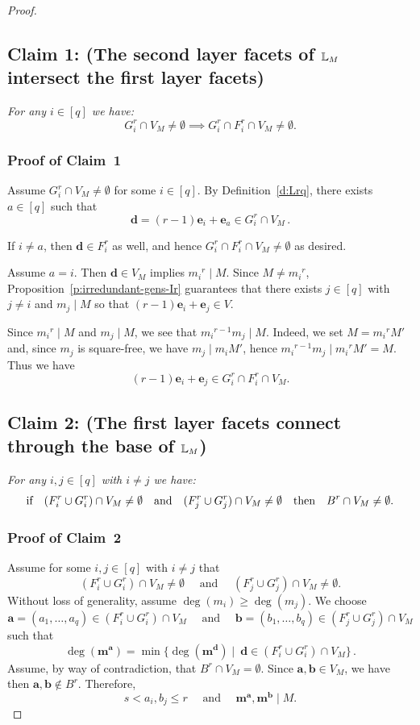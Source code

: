 \documentclass[11pt]{article}
\theoremstyle{definition}
\numberwithin{equation}{section}
\newcommand{\m}{\mathbf{m}}
\newcommand{\bd}{\mathbf{d}}
\newcommand{\ba}{\mathbf{a}}
\newcommand{\bb}{\mathbf{b}}
\newcommand{\be}{\mathbf{e}}
\newcommand{\bma}{\mathbf{m}^\ba}
\newcommand{\bmb}{\mathbf{m}^\bb}
\newcommand{\qand}{\quad \mbox{ and } \quad }
\begin{document}
\begin{proof}
\subsection*{\texorpdfstring{ \bf Claim 1: \textup{(}The second layer facets of ${\mathbb{L}}_M$
  intersect the first layer facets\textup{)}}{}} {\it For any $i\in [q]$ we have:}
$$G^r_{i}\cap V_M\ne \emptyset\implies G^r_{i}\cap F^r_{i}\cap
  V_{M}\ne \emptyset .$$


\subsubsection*{Proof of Claim~1} 
Assume $G^r_{i}\cap V_M\ne \emptyset$ for some $i\in [q]$.
By Definition~\ref{d:Lrq}, there exists $a\in [q]$ such that $$\bd = (r-1)\be_i +
\be_a \in G^r_{i}\cap V_M\,.$$

If $i\ne a$, then $\bd\in F^r_i$ as well, and hence
$G^r_{i}\cap F^r_{i}\cap V_M \ne \emptyset$ as desired.

Assume $a=i$. Then $\bd\in V_M$ implies ${m_i}^r\mid M$. Since $M\neq
{m_i}^r$, Proposition~\ref{p:irredundant-gens-Ir} guarantees that there exists
$j\in [q]$ with $j \neq i$ and $m_j \mid M$ so that $(r-1)\be_i+\be_j
\in V$.

 Since ${m_i}^r\mid M$ and $m_j\mid M$, we see that ${m_i}^{r-1}m_j\mid
 M$.  Indeed, we set $M={m_i}^rM'$ and, since $m_j$ is square-free, we
 have $m_j\mid m_iM'$, hence ${m_i}^{r-1}m_j\mid {m_i}^rM'=M$.
Thus we have
$$(r-1)\be_i+\be_j \in G^r_{i}\cap F^r_{i}\cap V_M.$$

 
\subsection*{\texorpdfstring{\bf Claim 2: \textup{(}The first layer facets connect through the
  base of ${\mathbb{L}}_M$\textup{)}} {} } {\it For any $i,j\in [q]$ with $i\ne j$ we
  have:}
$$ \mbox{\rm{if}} \quad (F^r_i\cup G^r_{i})\cap V_M\ne \emptyset\quad\text{and}\quad
 (F^r_j\cup G^r_{j})\cap V_M\ne \emptyset \quad \mbox{\rm{then}} \quad B^r \cap V_M\ne
 \emptyset .$$


 \subsubsection*{Proof of Claim~2}
 Assume for some $i,j\in [q]$ with $i\ne j$ that 
$$ (F^r_i\cup G^r_{i})\cap V_M\ne \emptyset \qand
 (F^r_j\cup G^r_{j})\cap V_M\ne \emptyset.$$
Without loss of generality, assume $\deg(m_i)\ge \deg(m_j)$. We choose 
 $$\ba = (a_1, \ldots, a_q) \in (F^r_i\cup G^r_{i})\cap V_M\qand
 \bb = (b_1, \ldots, b_q) \in (F^r_j\cup G^r_{j})\cap V_M$$
 such that 
 \begin{equation}
 \label{e:choose-a}
 \deg(\bma)=\min\{\deg(\m^\bd)\mid \ \bd\in (F^r_i\cup G^r_{i})\cap V_M\}\,.
 \end{equation}
 Assume, by way of contradiction, that $B^r\cap V_M=\emptyset$.  
   Since $\ba, \bb \in V_M$, we have then $\ba, \bb \notin B^r$.
   Therefore, $$s <a_i,b_j \le r \qand \bma, \bmb \mid M.$$


\end{proof}
\end{document}
